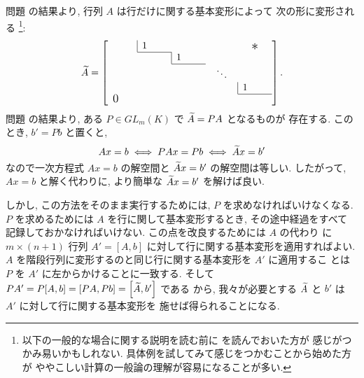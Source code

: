\documentclass[12pt,twoside]{jarticle}
\begin{document}
問題  の結果より, 行列 $A$ は行だけに関する基本変形によって
次の形に変形される%
\footnote{以下の一般的な場合に関する説明を読む前に
  を読んでおいた方が
  感じがつかみ易いかもしれない.  
  具体例を試してみて感じをつかむことから始めた方が
  ややこしい計算の一般論の理解が容易になることが多い.}:
\begin{equation*}
  \tA = 
  \left[
    \begin{array}{ccccc}
      \multicolumn{1}{c|}{\qquad} & 1 \qquad & & & \bigstaru \\
      \cline{2-2}
      \multicolumn{2}{c|}{} & 1 \qquad & & \\
      \cline{3-3}
      \multicolumn{3}{c}{} & \;\;\ddots\;\; & \\
      \multicolumn{4}{c|}{} & 1 \qquad \\
      \cline{5-5}
      \multicolumn{5}{l}{\bigzerol} \\
    \end{array}
  \right]. 
\end{equation*}
問題  の結果より, ある $P\in GL_m(K)$ で ${\widetilde A}=PA$ となるものが
存在する. このとき, $b'=Pb$ と置くと,
\begin{equation*}
  Ax = b \iff PAx = Pb \iff {\widetilde A} x = b'
\end{equation*}
なので一次方程式 $Ax=b$ の解空間と ${\widetilde A} x=b'$ の解空間は等しい.
したがって, $Ax=b$ と解く代わりに, より簡単な ${\widetilde A} x=b'$ を解けば良い.

しかし, この方法をそのまま実行するためには, $P$ を求めなければいけなくなる.
$P$ を求めるためには $A$ を行に関して基本変形するとき, その途中経過をすべて
記録しておかなければいけない.  この点を改良するためには $A$ の代わり
に $m\times(n+1)$ 行列 $A'=[A,b]$ に対して行に関する基本変形を適用すればよい.
$A$ を階段行列に変形するのと同じ行に関する基本変形を $A'$ に適用するこ
とは $P$ を $A'$ に左からかけることに一致する. 
そして $PA'=P[A,b]=[PA,Pb]=\left[{\widetilde A},b'\right]$ である
から, 我々が必要とする ${\widetilde A}$ と $b'$ は $A'$ に対して行に関する基本変形を
施せば得られることになる.
\end{document}
